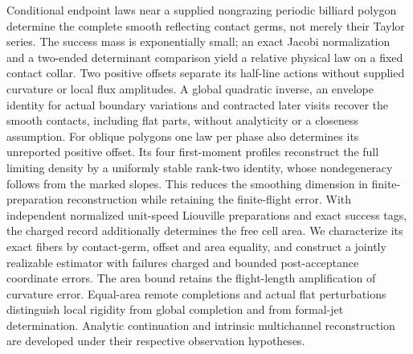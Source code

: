 Conditional endpoint laws near a supplied nongrazing periodic billiard
polygon determine the complete smooth reflecting contact germs, not
merely their Taylor series.  The success mass is exponentially small;
an exact Jacobi normalization and a two-ended determinant comparison
yield a relative physical law on a fixed contact collar.  Two positive
offsets separate its half-line actions without supplied curvature or
local flux amplitudes.  A global quadratic inverse, an envelope identity
for actual boundary variations and contracted later visits recover the
smooth contacts, including flat parts, without analyticity or a closeness
assumption.  For oblique polygons one law per phase also determines its
unreported positive offset.  Its four first-moment profiles reconstruct
the full limiting density by a uniformly stable rank-two identity, whose
nondegeneracy follows from the marked slopes.  This reduces the smoothing
dimension in finite-preparation reconstruction while retaining the
finite-flight error.  With independent normalized unit-speed Liouville
preparations and exact success tags, the charged record additionally
determines the free cell area.  We characterize its exact fibers by
contact-germ, offset and area equality, and construct a jointly realizable
estimator with failures charged and bounded post-acceptance coordinate
errors.  The area bound retains the flight-length amplification of
curvature error.  Equal-area remote completions and actual flat
perturbations distinguish local rigidity from global completion and
from formal-jet determination.  Analytic continuation and intrinsic
multichannel reconstruction are developed under their respective
observation hypotheses.
